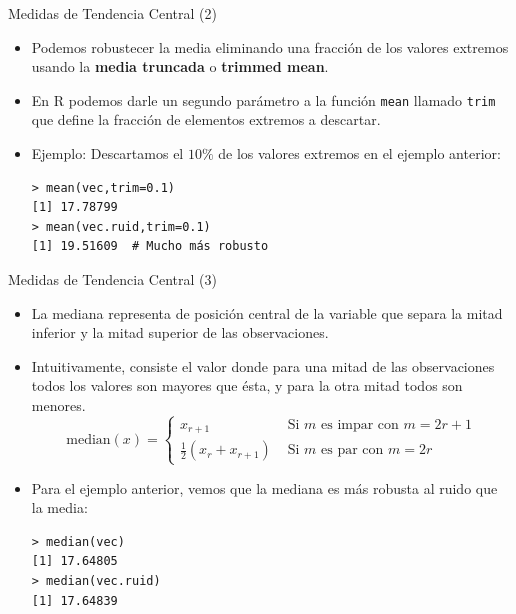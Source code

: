 \documentclass[handout]{beamer}
\begin{document}
\begin{frame}[fragile]{Medidas de Tendencia Central (2)}
\scriptsize{
\begin{itemize}
 \item Podemos robustecer la media eliminando una fracción de los valores extremos usando la \textbf{media truncada} o \textbf{trimmed mean}.
 \item En R podemos darle un segundo parámetro a la función \verb+mean+ llamado \verb+trim+ que define la fracción de elementos extremos a descartar. 
 \item Ejemplo: Descartamos el $10\%$ de los valores extremos en el ejemplo anterior:
 \begin{verbatim}
> mean(vec,trim=0.1)
[1] 17.78799
> mean(vec.ruid,trim=0.1)
[1] 19.51609  # Mucho más robusto 
\end{verbatim}

 
\end{itemize}

 
}
 
\end{frame}


\begin{frame}[fragile]{Medidas de Tendencia Central (3)}
\scriptsize{
\begin{itemize}
 \item La mediana representa de posición central de la variable que separa la mitad inferior y la mitad superior de las observaciones.
 \item Intuitivamente, consiste el valor donde para una mitad de las observaciones todos los valores son mayores que ésta, y para la otra mitad todos son menores.
   \begin{displaymath}
  \text{median}(x) =  \left\{ \begin{array}{rl}
    x_{r+1} &\mbox{ Si $m$ es impar con $m=2r+1$} \\
   \frac{1}{2}(x_r + x_{r+1}) &\mbox{ Si $m$ es par con $m=2r$ }
       \end{array} \right.
  \end{displaymath}
 
 \item Para el ejemplo anterior, vemos que la mediana es más robusta al ruido que la media:
 \begin{verbatim}
> median(vec)
[1] 17.64805
> median(vec.ruid)
[1] 17.64839
 \end{verbatim}

 
\end{itemize}

 
}
 
\end{frame}
\end{document}

